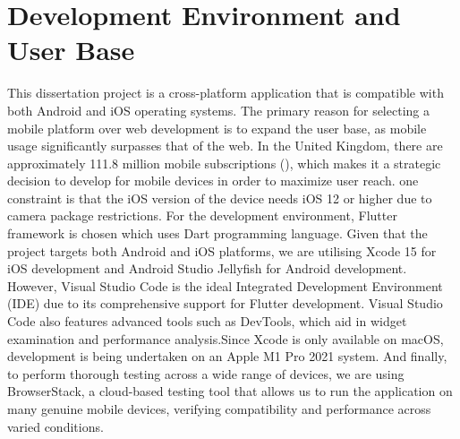 \section{Development Environment and User Base}
This dissertation project is a cross-platform application that is compatible with both Android and iOS operating systems. The primary reason for selecting a mobile platform over web development is to expand the user base, as mobile usage significantly surpasses that of the web. In the United Kingdom, there are approximately 111.8 million mobile subscriptions (\cite{mobile_uk}), which makes it a strategic decision to develop for mobile devices in order to maximize user reach. one constraint is that the iOS version of the device needs iOS 12 or higher due to camera package restrictions.
For the development environment, Flutter framework is chosen which uses Dart programming language. Given that the project targets both Android and iOS platforms, we are utilising Xcode 15 for iOS development and Android Studio Jellyfish for Android development. However, Visual Studio Code is the ideal Integrated Development Environment (IDE) due to its comprehensive support for Flutter development. Visual Studio Code also features advanced tools such as DevTools, which aid in widget examination and performance analysis.Since Xcode is only available on macOS, development is being undertaken on an Apple M1 Pro 2021 system. 
And finally, to perform thorough testing across a wide range of devices, we are using BrowserStack, a cloud-based testing tool that allows us to run the application on many genuine mobile devices, verifying compatibility and performance across varied conditions.